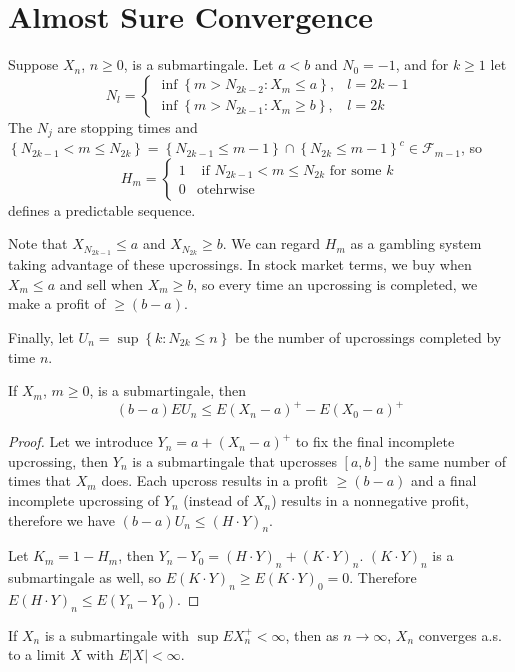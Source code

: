 \section{Almost Sure Convergence}
Suppose $X_n$, $n\ge0$, is a submartingale. Let $a<b$ and $N_0=-1$, and for $k\geq 1$ let \[ N_l=\left\{\begin{matrix}
\inf\left \{ m>N_{2k-2}:X_m\le a \right \},   &l=2k-1\\
\inf\left \{ m>N_{2k-1}:X_m\geq b \right \},&l=2k
\end{matrix}\right.\]
The $N_j$ are stopping times and $\left \{ N_{2k-1}<m\le N_{2k} \right \} =\left \{ N_{2k-1}\le m-1\right \} \cap\left \{ N_{2k}\le m-1 \right \}^c \in\mathcal{F}_{m-1}$, so \[H_m=\left\{\begin{matrix}
 1 & \text{ if }N_{2k-1}<m\le N_{2k} \text{ for some }k\\
 0& \text{otehrwise}
\end{matrix}\right.\]
defines a predictable sequence.\par
Note that $X_{N_{2k-1} }\le a$ and $X_{N_{2k}}\geq b$. We can regard $H_m$ as a gambling system taking advantage of these upcrossings. In stock market terms, we buy when $X_m\le a$ and sell when $X_m\geq b$, so every time an upcrossing is completed, we make a profit of $\geq (b-a)$. \par
Finally, let $U_n=\sup\left\{k:N_{2k}\le n\right\}$ be the number of upcrossings completed by time $n$.
\begin{theorem}
If $X_m$, $m\ge0$, is a submartingale, then \[(b-a)EU_n\le E(X_n-a)^+-E(X_0-a)^+\]
\end{theorem}
\begin{proof}
Let we introduce $Y_n=a+(X_n-a)^+$ to fix the final incomplete upcrossing, then $Y_n$ is a submartingale that upcrosses $[a,b]$ the same number of times that $X_m$ does. Each upcross results in a profit $\geq(b-a)$ and a final incomplete upcrossing of $Y_n$ (instead of $X_n$) results in a nonnegative profit, therefore we have $(b-a)U_n\le (H\cdot Y)_n$.\par
Let $K_m=1-H_m$, then $Y_n-Y_0=(H\cdot Y)_n+(K\cdot Y)_n$. $(K\cdot Y)_n$ is a submartingale as well, so $E(K\cdot Y)_n\geq E(K\cdot Y)_0=0$. Therefore $E(H\cdot Y)_n\le E(Y_n-Y_0)$.
\end{proof}
\begin{theorem}
If $X_n$ is a submartingale with $\sup EX_n^+<\infty$, then as $n\to\infty$, $X_n$ converges a.s. to a limit $X$ with $E\left|X\right|<\infty$.
\end{theorem}
